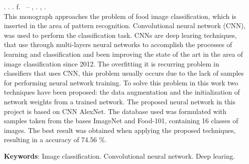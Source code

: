 
\begin{resumo}[ABSTRACT]
\begin{SingleSpacing}

\imprimirautorcitacao. \imprimirtitleabstract. \imprimirdata. \pageref {LastPage} f. \imprimirprojeto\ – \imprimirprograma, \imprimirinstituicao. \imprimirlocal, \imprimirdata.\\

This monograph approaches the problem of food image classification, which is inserted in the area of pattern recognition. Convolutional neural network (CNN), was used to perform the classification task.  CNNs are deep learing techniques, that use through multi-layers neural networks to accomplish the processes of learning and classification and been improving the state of the art in the area of image classification since 2012. The overfitting it is recurring problem in classifiers that uses CNN, this problem usually occurs due to the lack of samples for performing neural network training. To solve this problem in this work two techniques have been proposed: the data augmentation and the initialization of network weights from a trained network. The proposed neural network in this project is based on CNN AlexNet. The database used was formulated with samples taken from the bases ImageNet and Food-101, containing 16 classes of images. The best result was obtained when applying the proposed techniques, resulting in a accuracy of 74.56 \%.


\textbf{Keywords}: Image classification. Convolutional neural network. Deep learing.

\end{SingleSpacing}
\end{resumo}

